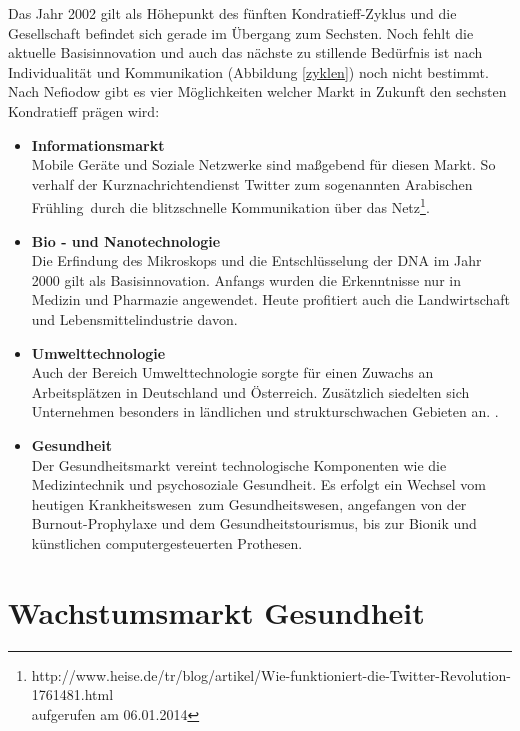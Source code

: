 Das Jahr 2002 gilt als Höhepunkt des fünften Kondratieff-Zyklus und die Gesellschaft befindet sich gerade im Übergang zum Sechsten. Noch fehlt die aktuelle Basisinnovation und auch das nächste zu stillende Bedürfnis ist nach Individualität und Kommunikation (Abbildung \ref{zyklen}) noch nicht bestimmt.\\
Nach Nefiodow \cite{nefiodow:gesundheit} gibt es vier Möglichkeiten welcher Markt in Zukunft den sechsten Kondratieff prägen wird:
\begin{itemize}
  \item \textbf{Informationsmarkt} \\
  		Mobile Geräte und Soziale Netzwerke sind maßgebend für diesen Markt. So verhalf der Kurznachrichtendienst Twitter zum sogenannten \glqq Arabischen Frühling\grqq\, durch die blitzschnelle Kommunikation über das Netz\footnote{http://www.heise.de/tr/blog/artikel/Wie-funktioniert-die-Twitter-Revolution-1761481.html \\aufgerufen am 06.01.2014}.
  \item \textbf{Bio - und Nanotechnologie} \\
  		Die Erfindung des Mikroskops und die Entschlüsselung der DNA im Jahr 2000 gilt als Basisinnovation. Anfangs wurden die Erkenntnisse nur in Medizin und Pharmazie angewendet. Heute profitiert auch die Landwirtschaft und Lebensmittelindustrie davon.
  \item \textbf{Umwelttechnologie}\\
  		Auch der Bereich Umwelttechnologie sorgte für einen Zuwachs an Arbeitsplätzen in Deutschland und Österreich. Zusätzlich siedelten sich Unternehmen besonders in ländlichen und strukturschwachen Gebieten an. \cite[S. 107]{nefiodow:gesundheit}.
  \item \textbf{Gesundheit}\\
  		Der Gesundheitsmarkt vereint technologische Komponenten wie die Medizintechnik und psychosoziale Gesundheit. Es erfolgt ein Wechsel vom heutigen \glqq Krankheitswesen\grqq\ zum Gesundheitswesen, angefangen von der Burnout-Prophylaxe und dem  Gesundheitstourismus, bis zur Bionik und künstlichen computergesteuerten Prothesen.
\end{itemize}

\FloatBarrier
\section{Wachstumsmarkt Gesundheit}

